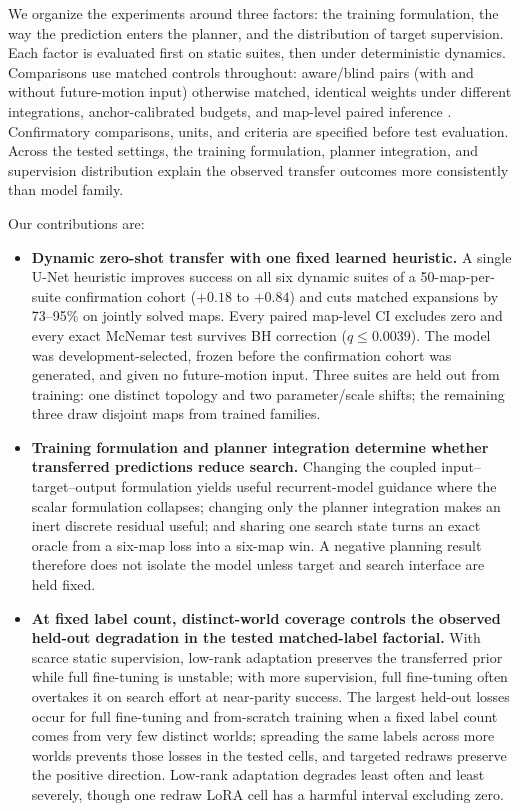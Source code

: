 \documentclass[letterpaper]{article} %
\begin{document}
We organize the experiments around three factors: the training formulation, the way the prediction enters the planner, and the distribution of target supervision. Each factor is evaluated first on static suites, then under deterministic dynamics. Comparisons use matched controls throughout: aware/blind pairs (with and without future-motion input) otherwise matched, identical weights under different integrations, anchor-calibrated budgets, and map-level paired inference \citep{henderson2018matters,agarwal2021precipice,pineau2021reproducibility}. Confirmatory comparisons, units, and criteria are specified before test evaluation. Across the tested settings, the training formulation, planner integration, and supervision distribution explain the observed transfer outcomes more consistently than model family.

Our contributions are:
\begin{itemize}
    \item \textbf{Dynamic zero-shot transfer with one fixed learned heuristic.} A single U-Net heuristic improves success on all six dynamic suites of a 50-map-per-suite confirmation cohort ($+0.18$ to $+0.84$) and cuts matched expansions by 73--95\% on jointly solved maps. Every paired map-level CI excludes zero and every exact McNemar test survives BH correction ($q \leq 0.0039$). The model was development-selected, frozen before the confirmation cohort was generated, and given no future-motion input. Three suites are held out from training: one distinct topology and two parameter/scale shifts; the remaining three draw disjoint maps from trained families.
    \item \textbf{Training formulation and planner integration determine whether transferred predictions reduce search.} Changing the coupled input--target--output formulation yields useful recurrent-model guidance where the scalar formulation collapses; changing only the planner integration makes an inert discrete residual useful; and sharing one search state turns an exact oracle from a six-map loss into a six-map win. A negative planning result therefore does not isolate the model unless target and search interface are held fixed.
    \item \textbf{At fixed label count, distinct-world coverage controls the observed held-out degradation in the tested matched-label factorial.} With scarce static supervision, low-rank adaptation preserves the transferred prior while full fine-tuning is unstable; with more supervision, full fine-tuning often overtakes it on search effort at near-parity success. The largest held-out losses occur for full fine-tuning and from-scratch training when a fixed label count comes from very few distinct worlds; spreading the same labels across more worlds prevents those losses in the tested cells, and targeted redraws preserve the positive direction. Low-rank adaptation degrades least often and least severely, though one redraw LoRA cell has a harmful interval excluding zero.
\end{itemize}
\end{document}
